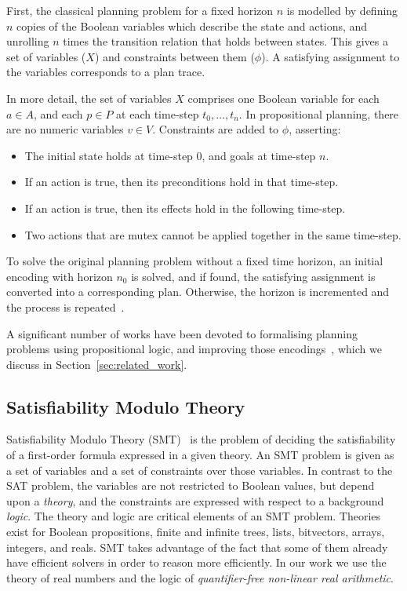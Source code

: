 First, the classical planning problem for a fixed horizon $n$ is modelled by defining $n$ copies of the Boolean variables which describe the state and actions, and unrolling $n$ times the transition relation that holds between states. This gives a set of variables ($X$) and constraints between them ($\phi$). A satisfying assignment to the variables corresponds to a plan trace.

In more detail, the set of variables $X$ comprises one Boolean variable for each $a\in A$, and each $p\in P$ at each time-step $t_0, \ldots, t_n$. In propositional planning, there are no numeric variables $v\in V$. Constraints are added to $\phi$, asserting:
\begin{itemize}
\item The initial state holds at time-step $0$, and goals at time-step $n$.
\item If an action is true, then its preconditions hold in that time-step.
\item If an action is true, then its effects hold in the following time-step.
\item Two actions that are mutex cannot be applied together in the same time-step.
\end{itemize}

To solve the original planning problem without a fixed time horizon, an initial encoding with horizon $n_0$ is solved, and if found, the satisfying assignment is converted into a corresponding plan. Otherwise, the horizon is incremented and the process is repeated~\cite{kau99}.

A significant number of works have been devoted to formalising planning problems using propositional logic, and improving those encodings~\cite{rin06,che07,rob09,rin10,cas12b}, which we discuss in Section~\ref{sec:related_work}.

\subsection{Satisfiability Modulo Theory}

Satisfiability Modulo Theory (SMT)~\cite{bar18} is the problem of deciding the satisfiability of a first-order formula expressed in a given theory. An SMT problem is given as a set of variables and a set of constraints over those variables. In contrast to the SAT problem, the variables are not restricted to Boolean values, but depend upon a \textit{theory}, and the constraints are expressed with respect to a background \textit{logic}.
%
The theory and logic are critical elements of an SMT problem. Theories exist for Boolean propositions, finite and infinite trees, lists, bitvectors, arrays, integers, and reals. SMT takes advantage of the fact that some of them already have efficient solvers in order to reason more efficiently. In our work we use the theory of real numbers and the logic of \textit{quantifier-free non-linear real arithmetic}.

